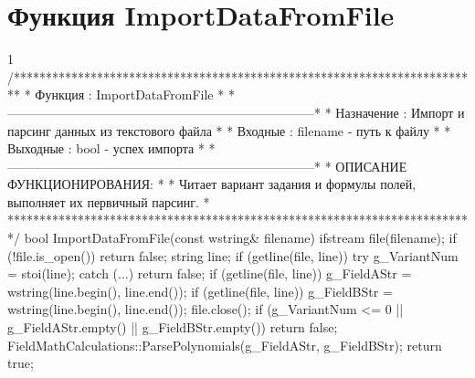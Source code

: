 \pagebreak

\section{Функция ImportDataFromFile}
\footnotesize
\begin{listing}{1}
/*************************************************************************
* Функция       : ImportDataFromFile                                     *
*------------------------------------------------------------------------*
* Назначение    : Импорт и парсинг данных из текстового файла            *
* Входные       : filename - путь к файлу                                *
* Выходные      : bool - успех импорта                                   *
*------------------------------------------------------------------------*
* ОПИСАНИЕ ФУНКЦИОНИРОВАНИЯ:                                             *
* Читает вариант задания и формулы полей, выполняет их первичный парсинг. *
*************************************************************************/
bool ImportDataFromFile(const wstring& filename) {
    ifstream file(filename);
    if (!file.is_open()) return false;
    string line;
    if (getline(file, line)) { 
        try { g_VariantNum = stoi(line); } 
        catch (...) { return false; } 
    }
    if (getline(file, line)) 
        g_FieldAStr = wstring(line.begin(), line.end());
    if (getline(file, line)) 
        g_FieldBStr = wstring(line.begin(), line.end());
    file.close();
    if (g_VariantNum <= 0 || g_FieldAStr.empty() || g_FieldBStr.empty()) 
        return false;
    FieldMathCalculations::ParsePolynomials(g_FieldAStr, g_FieldBStr);
    return true;
}
\end{listing}
\normalsize

\pagebreak

